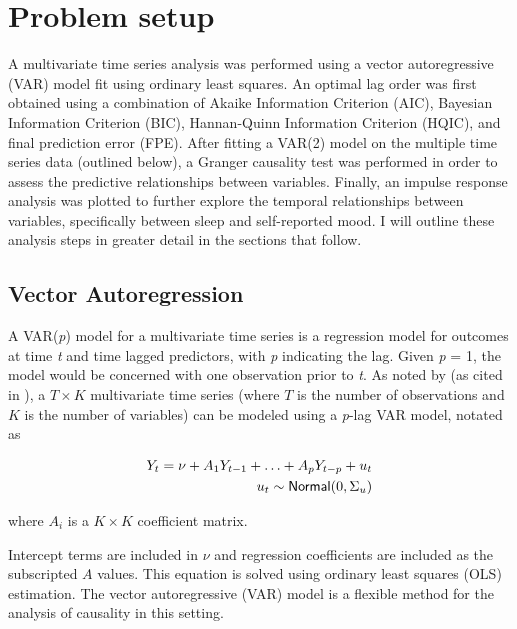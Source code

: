 \documentclass{article}
\begin{document}
\hypertarget{methods}{%
\section{Problem setup}\label{methods}}

A multivariate time series analysis was performed using a vector autoregressive
(VAR) model fit using ordinary least squares. An optimal lag order was first
obtained using a combination of Akaike Information Criterion (AIC), Bayesian
Information Criterion (BIC), Hannan-Quinn Information Criterion (HQIC), and
final prediction error (FPE). After fitting a VAR(2) model on the multiple time
series data (outlined below), a Granger causality test was performed in order to
assess the predictive relationships between variables. Finally, an impulse
response analysis was plotted to further explore the temporal relationships
between variables, specifically between sleep and self-reported mood. I will
outline these analysis steps in greater detail in the sections that follow.

\hypertarget{vector-autoregression}{%
\subsection{Vector Autoregression}\label{vector-autoregression}}


A VAR(\textit{p}) model for a multivariate time series is a regression model for
outcomes at time \textit{t} and time lagged predictors, with \textit{p}
indicating the lag. Given \textit{p} = 1, the model would be concerned with one
observation prior to \textit{t}. As noted by \citet{lutkepohlNew2005}
(as cited in \citealt{seabold2010statsmodels}), a \(T \times K\) multivariate time
series (where \(T\) is the number of observations and \(K\) is the number of
variables) can be modeled using a \textit{p}-lag VAR model, notated as


\begin{equation}
  \begin{split}
    Y_t = \nu + A_1 Y_{t-1} + \ldots + A_p Y_{t-p} + u_t \\ u_t \sim {\sf Normal}(0, \Sigma_u)
  \end{split}
\end{equation}

where \(A_i\) is a \(K \times K\) coefficient matrix.


Intercept terms are included in \(\nu\) and regression coefficients are included
as the subscripted \(A\) values. This equation is solved using ordinary least
squares (OLS) estimation. The vector autoregressive (VAR) model is a flexible
method for the analysis of causality in this setting.
\end{document}
